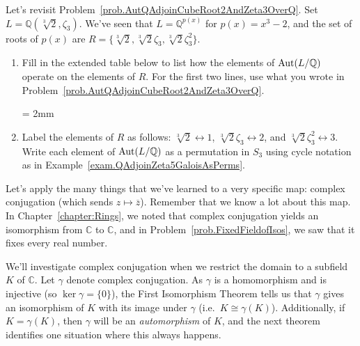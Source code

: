 \begin{problem}\label{prob.AutQAdjoinCubeRoot2AndZeta3OverQAsPerms}
Let's revisit Problem~\ref{prob.AutQAdjoinCubeRoot2AndZeta3OverQ}. Set $L = \mathbb{Q}(\sqrt[3]{2},\zeta_3)$. We've seen that $L = \mathbb{Q}^{p(x)}$ for $p(x) = x^3-2$,  and the set of roots of $p(x)$ are $R=\{\sqrt[3]{2},\sqrt[3]{2}\zeta_3,\sqrt[3]{2}\zeta_3^2\}$. 
\begin{enumerate}
\item Fill in the extended table below to list how the elements of $\operatorname{Aut}(L/\mathbb{Q})$ operate on the elements of $R$. For the first two lines, use what you wrote in Problem~\ref{prob.AutQAdjoinCubeRoot2AndZeta3OverQ}.
\begin{center}
\tabulinesep = 2mm
\end{center}
\item Label the elements of $R$ as follows: $\sqrt[3]{2} \leftrightarrow 1$, $\sqrt[3]{2}\zeta_3 \leftrightarrow 2$, and $\sqrt[3]{2}\zeta_3^2 \leftrightarrow 3$. Write each element of $\operatorname{Aut}(L/\mathbb{Q})$ as a permutation in $S_3$ using cycle notation as in Example~\ref{exam.QAdjoinZeta5GaloisAsPerms}.
\end{enumerate}
\end{problem}

Let's apply the many things that we've learned to a very specific map: complex conjugation (which sends $z\mapsto \overline{z}$). Remember that we know a lot about this map. In Chapter~\ref{chapter:Rings}, we noted that complex conjugation yields an isomorphism from $\mathbb{C}$ to $\mathbb{C}$, and in Problem~\ref{prob.FixedFieldofIsos}, we saw that it fixes every real number. 

We'll investigate complex conjugation when we restrict the domain to a subfield $K$ of $\mathbb{C}$. Let $\gamma$ denote complex conjugation. As $\gamma$ is a homomorphism and is injective (so $\ker \gamma = \{0\}$), the First Isomorphism Theorem tells us that $\gamma$ gives an isomorphism of $K$ with its image under $\gamma$ (i.e.~$K\cong \gamma(K)$). Additionally, if $K= \gamma(K)$, then $\gamma$ will be an \emph{automorphism} of $K$, and the next theorem identifies one situation where this always happens. 


